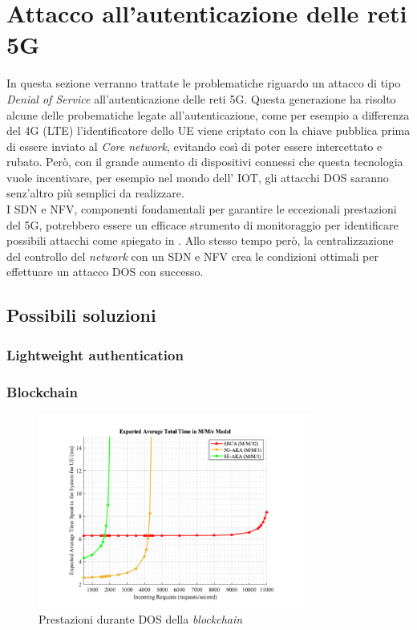 \section{Attacco all'autenticazione delle reti 5G}
In questa sezione verranno trattate le problematiche riguardo un attacco di tipo \textit{Denial of Service} all'autenticazione delle reti 5G.
Questa generazione ha risolto alcune delle probematiche legate all'autenticazione, come per esempio a differenza del 4G (LTE) l'identificatore 
dello UE viene criptato con la chiave pubblica prima di essere inviato al \textit{Core network}, evitando così di poter essere intercettato e rubato\cite{5g-vs-4g}.
Però, con il grande aumento di dispositivi connessi che questa tecnologia vuole incentivare, per esempio nel mondo dell' IOT, gli attacchi DOS saranno senz'altro più 
semplici da realizzare.\\
I SDN e NFV, componenti fondamentali per garantire le eccezionali prestazioni del 5G, potrebbero essere un efficace strumento di monitoraggio per identificare possibili 
attacchi come spiegato in \cite{dos-detection-with-sdn}.
Allo stesso tempo però, la centralizzazione del controllo del \textit{network} con un SDN e NFV crea le condizioni ottimali per effettuare un attacco DOS con successo\cite{5g-dos}.
\subsection{Possibili soluzioni}
\subsubsection{Lightweight authentication}
\cite{5g-lightweight}
\subsubsection{Blockchain}
\begin{figure}[ht]
    \centering
    \includegraphics[width=0.8\textwidth]{images/5g-blockchain-dos.png}
    \caption{Prestazioni durante DOS della \textit{blockchain}\cite{5g-blockchain}}
\end{figure}

\cite{5g-imsi-encryption}
